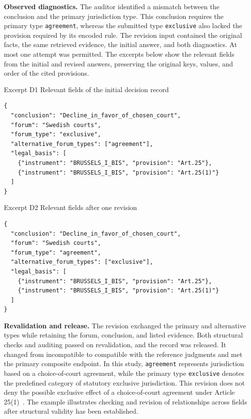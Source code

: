 \documentclass[pdflatex,iicol,sn-mathphys-num]{sn-jnl}
\newcommand{\paperref}[1]{~\citep{#1}}
\begin{document}
\textbf{Observed diagnostics.} The auditor identified a mismatch between the conclusion and the primary jurisdiction type. This conclusion requires the primary type \texttt{agreement}, whereas the submitted type \texttt{exclusive} also lacked the provision required by its encoded rule. The revision input contained the original facts, the same retrieved evidence, the initial answer, and both diagnostics. At most one attempt was permitted. The excerpts below show the relevant fields from the initial and revised answers, preserving the original keys, values, and order of the cited provisions.


\par\noindent\begin{minipage}{\columnwidth}
Excerpt D1 Relevant fields of the initial decision record\par
\begin{Verbatim}[fontsize=\footnotesize,breaklines=true,breakanywhere=true,breaksymbolleft={},frame=lines,framesep=3mm,rulecolor=\color{lightgray}]
{
  "conclusion": "Decline_in_favor_of_chosen_court",
  "forum": "Swedish courts",
  "forum_type": "exclusive",
  "alternative_forum_types": ["agreement"],
  "legal_basis": [
    {"instrument": "BRUSSELS_I_BIS", "provision": "Art.25"},
    {"instrument": "BRUSSELS_I_BIS", "provision": "Art.25(1)"}
  ]
}
\end{Verbatim}
\end{minipage}\par

\par\noindent\begin{minipage}{\columnwidth}
Excerpt D2 Relevant fields after one revision\par
\begin{Verbatim}[fontsize=\footnotesize,breaklines=true,breakanywhere=true,breaksymbolleft={},frame=lines,framesep=3mm,rulecolor=\color{lightgray}]
{
  "conclusion": "Decline_in_favor_of_chosen_court",
  "forum": "Swedish courts",
  "forum_type": "agreement",
  "alternative_forum_types": ["exclusive"],
  "legal_basis": [
    {"instrument": "BRUSSELS_I_BIS", "provision": "Art.25"},
    {"instrument": "BRUSSELS_I_BIS", "provision": "Art.25(1)"}
  ]
}
\end{Verbatim}
\end{minipage}\par

\textbf{Revalidation and release.} The revision exchanged the primary and alternative types while retaining the forum, conclusion, and listed evidence. Both structural checks and auditing passed on revalidation, and the record was released. It changed from incompatible to compatible with the reference judgments and met the primary composite endpoint. In this study, \texttt{agreement} represents jurisdiction based on a choice-of-court agreement, while the primary type \texttt{exclusive} denotes the predefined category of statutory exclusive jurisdiction. This revision does not deny the possible exclusive effect of a choice-of-court agreement under Article 25(1)\paperref{EU1215_2012_Consolidated20150226}. The example illustrates checking and revision of relationships across fields after structural validity has been established.
\end{document}

